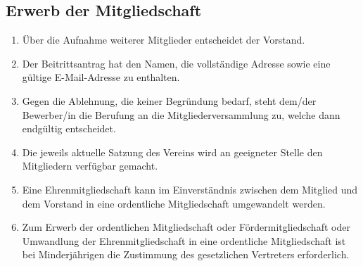 \documentclass[12pt,a4paper,draft]{article}
\begin{document}
\subsection{Erwerb der Mitgliedschaft} %
\begin{enumerate}
\item Über die Aufnahme weiterer Mitglieder entscheidet der Vorstand.

\item Der Beitrittsantrag hat den Namen, die vollständige Adresse sowie eine 
gültige E-Mail-Adresse zu enthalten.

\item Gegen die Ablehnung, die keiner Begründung bedarf, steht dem/der 
Bewerber/in die Berufung an die Mitgliederversammlung zu, welche dann 
endgültig entscheidet.

\item Die jeweils 
aktuelle Satzung des Vereins wird an geeigneter Stelle den Mitgliedern 
verfügbar gemacht.

\item Eine Ehrenmitgliedschaft kann im Einverständnis zwischen dem Mitglied 
und dem Vorstand in eine ordentliche Mitgliedschaft umgewandelt werden.

\item Zum Erwerb der ordentlichen Mitgliedschaft oder Fördermitgliedschaft oder Umwandlung der 
Ehrenmitgliedschaft in eine ordentliche Mitgliedschaft ist bei 
Minderjährigen die Zustimmung des gesetzlichen Vertreters erforderlich.
\end{enumerate}
\end{document}
